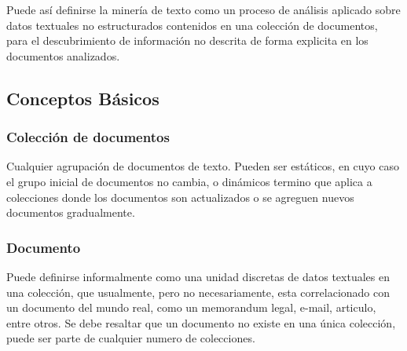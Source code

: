   Puede así definirse la minería de texto como un proceso de análisis aplicado sobre datos textuales no estructurados contenidos en una colección de documentos, para el descubrimiento de información no descrita de forma explicita en los documentos analizados.

\subsection{Conceptos Básicos}

  \subsubsection{Colección de documentos}
    Cualquier agrupación de documentos de texto. Pueden ser estáticos, en cuyo caso el grupo inicial de documentos no cambia, o dinámicos termino que aplica a colecciones donde los documentos son actualizados o se agreguen nuevos documentos gradualmente.\cite{tmhandbook}

  \subsubsection{Documento}
    Puede definirse informalmente como una unidad discretas de datos textuales en una colección, que usualmente, pero no necesariamente, esta correlacionado con un documento del mundo real, como un memorandum legal, e-mail, articulo,  entre otros. Se debe resaltar que un documento no existe en una única colección, puede ser parte de cualquier numero de colecciones.\cite{tmhandbook}


